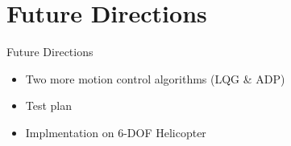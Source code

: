 \documentclass{beamer}
\begin{document}


  


\section{Future Directions}

\begin{frame}{Future Directions}{} %
  \begin{itemize}
    \item Two more motion control algorithms (LQG \& ADP)
    \item Test plan
    \item Implmentation on 6-DOF Helicopter
  \end{itemize}
\end{frame}



\end{document}
